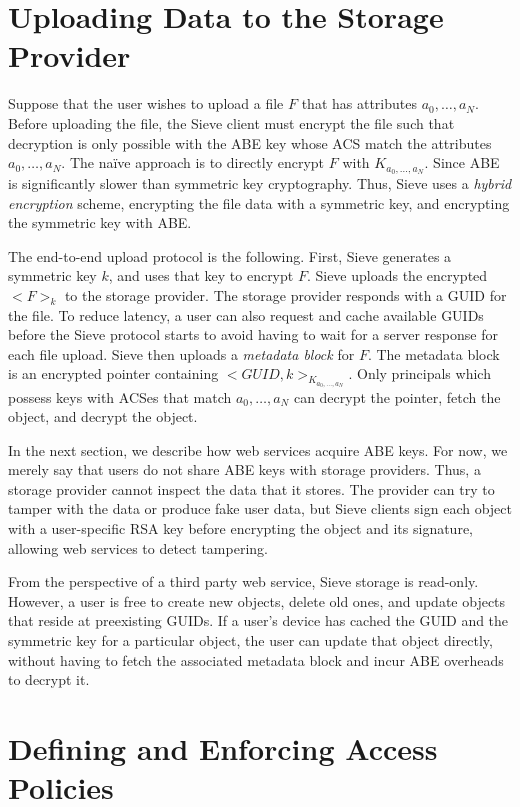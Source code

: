 \section{Uploading Data to the Storage Provider}
\label{sec:dataPush}

Suppose that the user wishes to upload a file
$F$ that has attributes $a_0,\ldots,a_N$.
Before uploading the file, the Sieve client
must encrypt the file such that decryption
is only possible with the ABE key whose ACS
match the attributes $a_0,\ldots,a_N$. The na{\"i}ve
approach is to directly encrypt $F$ with
$K_{a_0,\ldots,a_N}$. Since ABE is significantly
slower than symmetric key cryptography. Thus,
Sieve uses a \textit{hybrid encryption} scheme,
encrypting the file data with a symmetric key,
and encrypting the symmetric key with ABE.

The end-to-end upload protocol is the following.
First, Sieve generates a symmetric key $k$,
and uses that key to encrypt $F$. Sieve uploads
the encrypted $<F>_k$ to the storage provider.
The storage provider responds with a GUID for
the file. To reduce latency, a user can also
request and cache available GUIDs before
the Sieve protocol starts to avoid having to
wait for a server response for each file upload. 
Sieve then uploads a \emph{metadata
block} for $F$. The metadata block is an encrypted
pointer containing $<GUID, k>_{K_{a_0,\ldots,a_N}}$.
Only principals which possess keys with ACSes that
match $a_0,\ldots,a_N$ can
decrypt the pointer, fetch the object, and
decrypt the object.

In the next section, we describe how web services
acquire ABE keys. For now, we merely say that
users do not share ABE keys with storage providers.
Thus, a storage provider cannot inspect the data
that it stores. The provider can try to tamper
with the data or produce fake user data, but
Sieve clients sign each object with a user-specific
RSA key before encrypting the object and its signature, 
allowing web services to detect tampering.

From the perspective of a third party
web service, Sieve storage is read-only.
However, a user is free to create new
objects, delete old ones, and update
objects that reside at preexisting
GUIDs. If a user's device has cached
the GUID and the symmetric key for a
particular object, the user can update
that object directly, without having
to fetch the associated metadata block
and incur ABE overheads to decrypt it.

\section{Defining and Enforcing Access Policies}
\label{sec:policies}

